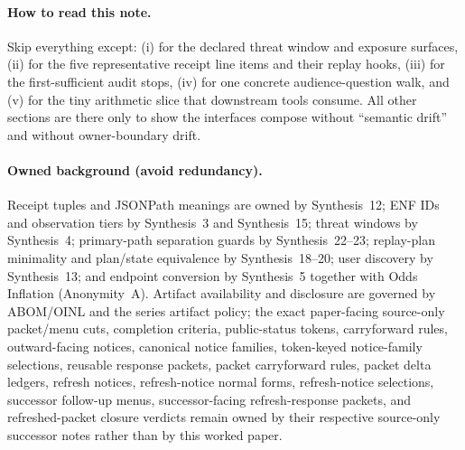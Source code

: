 \documentclass[11pt]{article}
\begin{document}
\paragraph{How to read this note.}
Skip everything except:
(i)  for the declared threat window and exposure surfaces,
(ii)  for the five representative receipt line items and their replay hooks,
(iii)  for the first-sufficient audit stops,
(iv)  for one concrete audience-question walk, and
(v)  for the tiny arithmetic slice that downstream tools consume.
All other sections are there only to show the interfaces compose without ``semantic drift'' and without owner-boundary drift.

\paragraph{Owned background (avoid redundancy).}
Receipt tuples and JSONPath meanings are owned by Synthesis~12; ENF IDs and observation tiers by Synthesis~3 and Synthesis~15; threat windows by Synthesis~4; primary-path separation guards by Synthesis~22--23; replay-plan minimality and plan/state equivalence by Synthesis~18--20; user discovery by Synthesis~13; and endpoint conversion by Synthesis~5 together with Odds Inflation (Anonymity~A).\cite{series:receiptitems,series:traceifaces,series:tieredobs,series:threatwindows,series:primarysepmanifest,series:probsep,series:planstateequiv,series:auditorreplay,series:userminiface,series:endpointbridge,series:oddsinflation}
Artifact availability and disclosure are governed by ABOM/OINL and the series artifact policy; the exact paper-facing source-only packet/menu cuts, completion criteria, public-status tokens, carryforward rules, outward-facing notices, canonical notice families, token-keyed notice-family selections, reusable response packets, packet carryforward rules, packet delta ledgers, refresh notices, refresh-notice normal forms, refresh-notice selections, successor follow-up menus, successor-facing refresh-response packets, and refreshed-packet closure verdicts remain owned by their respective source-only successor notes rather than by this worked paper.\cite{series:abomoinl,series:artifactpolicy,series:publicrequestcontracts,series:requestableevidenceclasses,series:requestfulfillmentcertificates,series:publicrequeststatusenvelopes,series:publicrequestcarryforward,series:publicrequestnotices,series:publicrequestnoticenormalforms,series:publicrequestnoticeselections,series:publicrequestresponsepackets,series:publicrequestresponsepacketcarryforward,series:publicrequestresponsepacketdeltas,series:publicrequestresponsepacketrefreshnotices,series:publicrequestresponsepacketrefreshnoticenormalforms,series:publicrequestresponsepacketrefreshnoticeselections,series:publicrequestresponsepacketrefreshresponsemenus,series:publicrequestresponsepacketrefreshresponsepackets,series:publicrequestresponsepacketrefreshresponsepacketclosureverdicts}
\end{document}
